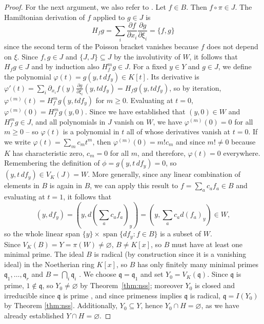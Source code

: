 \documentclass[pdflatex,sn-mathphys-num]{sn-jnl}
\numberwithin{equation}{section}
\theoremstyle{thmstyleone}
\theoremstyle{thmstyletwo}
\begin{document}
\begin{proof}
For the next argument, we also refer to \cite[Ch. E.2]{HTT}. Let $f\in B$. Then $f\circ\pi\in J$.
The Hamiltonian derivation of $f$ applied to $g \in J$ is
\[ H_f g=\sum_i\frac{\partial f}{\partial x_i}
 \frac{\partial g}{\partial\xi_i} = \{f,g\}\]
since the second term of the Poisson bracket vanishes because $f$ does not depend on $\xi$. Since $f, g \in J$ and $\{J, J\} \subseteq J$ by the involutivity of $W$, it follows that $H_f g \in J$ and by induction also $H^m_fg \in J$. 
For a fixed $y \in Y$ and $g \in J$, we define the polynomial $\varphi(t)=g(y,t\,df_y)\in K[t]$. Its derivative is $\varphi'(t) = \sum_i\partial_{x_i}f(y)\frac{\partial g}{\partial \xi_i}{(y, tdf_y)} = H_fg(y, tdf_y)$, so by iteration, $\varphi^{(m)}(t) = H^m_fg(y, tdf_y)$ for $m\geq 0.$ 
Evaluating at $t = 0$, $\varphi^{(m)}(0) = H_f^mg(y,0).$ Since we have established that $(y,0)\in W$ and $H^m_fg \in J$, and all polynomials in $J$ vanish on $W$, we have $\varphi^{(m)}(0) = 0$ for all $m\geq 0$ -- so $\varphi(t)$ is a polynomial in $t$ all of whose derivatives vanish at $t = 0$.  If we write $\varphi(t) = \sum_m c_mt^m$, then $\varphi^{(m)}(0) = m!c_m$ and since $m!\neq 0$ because $K$ has characteristic zero, $c_m = 0$ for all $m$, and therefore, $\varphi(t) = 0$ everywhere. Remembering the definition of $\phi = g(y,t\,df_y) = 0$, so $(y,t\,df_y) \in V_K(J) = W$.
More generally, since any linear combination of elements in $B$ is again in $B$, we can apply this result to $f = \sum_a c_af_a \in B$ and evaluating at $t = 1$, it follows that 
\[(y, df_y) = (y, d(\sum_ac_af_a)_y) = (y, \sum_a c_ad(f_a)_y) \in W,\]
so the whole linear span $\{y\}\times \operatorname{span}\{df_y:f \in B\}$ is a subset of $W$.\\


Since $V_K(B)=Y=\pi(W)\neq\varnothing$, $B \neq K[x]$, so $B$ must have at least one minimal prime. The ideal $B$ is radical (by construction since it is a vanishing ideal) in the Noetherian ring $K[x]$, so $B$ has only finitely many minimal primes $\mathfrak q_1,\dots,\mathfrak q_r$ and $B=\bigcap_i\mathfrak q_i$ \cite[Cor. I.1.4 and Prop. I.1.5]{hartshorne}. We choose $\mathfrak q=\mathfrak q_1$ and set $Y_0=V_K(\mathfrak q)$. Since $\mathfrak q$ is prime, $1\notin\mathfrak q$, so $Y_0\neq\varnothing$ by Theorem~\ref{thm:nss}; moreover $Y_0$ is closed and irreducible since $\mathfrak q$ is prime \cite[Cor.~I.1.4]{hartshorne}, and since primeness implies $\mathfrak q$ is radical, $\mathfrak q = I(Y_0)$ by Theorem \ref{thm:nss}. Additionally, $Y_0\subseteq Y$, hence
$Y_0\cap H=\varnothing$, as we have already established $Y\cap H=\varnothing$.


\end{proof}
\end{document}
